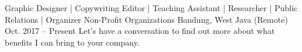 \begin{cventries}
\cventry
{Graphic Designer | Copywriting Editor | Teaching Assistant | Researcher | Public Relations | Organizer} %
{Non-Profit Organizations} %
{Bandung, West Java (Remote)} %
{Oct. 2017 -- Present} %
{ %
Let's have a conversation to find out more about what benefits I can bring to your company.
}






\end{cventries}
